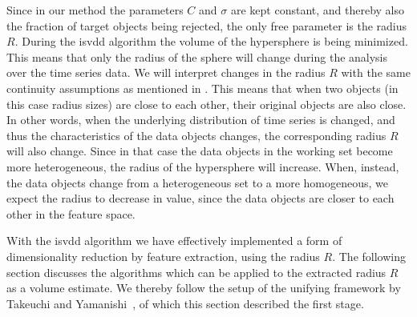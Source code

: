 Since in our method the parameters $C$ and $\sigma$ are kept constant, and thereby also the fraction of target objects being rejected, the only free parameter is the radius $R$.
During the \gls{isvdd} algorithm the volume of the hypersphere is being minimized.
This means that only the radius of the sphere will change during the analysis over the time series data.
We will interpret changes in the radius $R$ with the same continuity assumptions as mentioned in .
This means that when two objects (in this case radius sizes) are close to each other, their original objects are also close.
In other words, when the underlying distribution of time series is changed, and thus the characteristics of the data objects changes, the corresponding radius $R$ will also change.
Since in that case the data objects in the working set become more heterogeneous, the radius of the hypersphere will increase.
When, instead, the data objects change from a heterogeneous set to a more homogeneous, we expect the radius to decrease in value, since the data objects are closer to each other in the feature space.

With the \gls{isvdd} algorithm we have effectively implemented a form of dimensionality reduction by feature extraction, using the radius $R$.
The following section discusses the algorithms which can be applied to the extracted radius $R$ as a volume estimate.
We thereby follow the setup of the unifying framework by Takeuchi and Yamanishi~\cite{takeuchi2006unifying}, of which this section described the first stage.